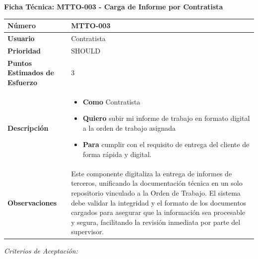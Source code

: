 \vspace{1em}
\noindent\textbf{Ficha Técnica: MTTO-003 - Carga de Informe por Contratista}
\footnotesize\setlength{\tabcolsep}{4pt}\renewcommand{\arraystretch}{1.2}
\begin{longtable}{|p{0.21\textwidth}|p{0.74\textwidth}|}\hline
\textbf{Número} & MTTO-003 \\ \hline
\textbf{Usuario} & Contratista \\ \hline
\textbf{Prioridad} & SHOULD \\ \hline
\textbf{Puntos Estimados de Esfuerzo} & 3 \\ \hline
\textbf{Descripción} & \parbox[t]{\linewidth}{\vspace{2pt}\begin{itemize}[leftmargin=1.5em, nosep, topsep=0pt]
\item \textbf{Como} Contratista
\item \textbf{Quiero} subir mi informe de trabajo en formato digital a la orden de trabajo asignada
\item \textbf{Para} cumplir con el requisito de entrega del cliente de forma rápida y digital.
\end{itemize}\vspace{2pt}} \\ \hline
\textbf{Observaciones} & Este componente digitaliza la entrega de informes de terceros, unificando la documentación técnica en un solo repositorio vinculado a la Orden de Trabajo. El sistema debe validar la integridad y el formato de los documentos cargados para asegurar que la información sea procesable y segura, facilitando la revisión inmediata por parte del supervisor. \\ \hline
\end{longtable}\normalsize
\noindent\textit{Criterios de Aceptación:}
